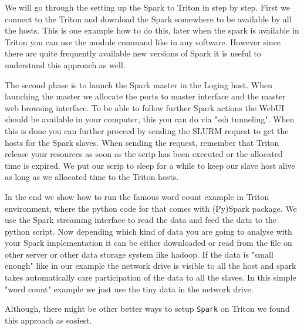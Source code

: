\documentclass[a4paper,11pt]{article}
\begin{document}
We will go through the setting up the Spark to Triton in step by step. First we connect to the Triton and download the Spark somewhere to be available by all the hosts. This is one example how to do this, later when the spark is available in Triton you can use the module command like in any software. However since there are quite frequently available new versions of Spark it is useful to understand this approach as well. 

The second phase is to launch the Spark master in the Loging host. When launching the master we allocate the ports to master interface and the master web browsing interface. To be able to follow further Spark actions the WebUI  should be available in your computer, this you can do via "ssh tunneling". When this is done you can further proceed by sending the SLURM request to get the hosts for the Spark slaves. When sending the request, remember that Triton release your resources as soon as the scrip has been executed or the allocated time is expired. We put our scrip to sleep for a while to keep our slave host alive as long as we allocated time to the Triton hosts.  

In the end we show how to run the famous word count example in Triton environment, where the python code for that comes with (Py)Spark package. We use the Spark streaming interface to read the data and feed the data to the python script. Now depending which kind of data you are going to analyse with your Spark implementation it can be either downloaded or read from the file on other server or other data storage system like hadoop. If the data is "small enough" like in our example the network drive is visible to all the host and spark takes automatically care participation of the data to all the slaves. In this simple "word count"  example we just use the tiny data in the network drive.

Although, there might be other better ways to setup \texttt{Spark} on Triton we found this approach as easiest. 
\end{document}
